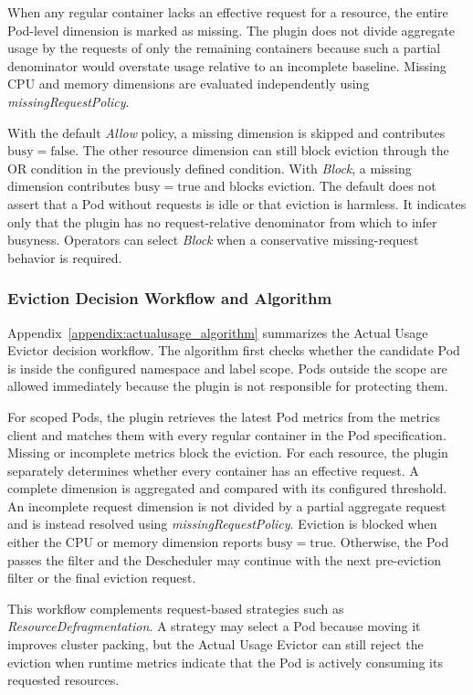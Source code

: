 When any regular container lacks an effective request for a resource, the entire Pod-level dimension is marked as missing. The plugin does not divide aggregate usage by the requests of only the remaining containers because such a partial denominator would overstate usage relative to an incomplete baseline. Missing CPU and memory dimensions are evaluated independently using \textit{missingRequestPolicy}.

With the default \textit{Allow} policy, a missing dimension is skipped and contributes \(\mathrm{busy}=\mathrm{false}\). The other resource dimension can still block eviction through the OR condition in the previously defined condition. With \textit{Block}, a missing dimension contributes \(\mathrm{busy}=\mathrm{true}\) and blocks eviction. The default does not assert that a Pod without requests is idle or that eviction is harmless. It indicates only that the plugin has no request-relative denominator from which to infer busyness. Operators can select \textit{Block} when a conservative missing-request behavior is required.

\subsubsection{Eviction Decision Workflow and Algorithm}
\label{sec:actualusage_algorithm}

Appendix~\ref{appendix:actualusage_algorithm} summarizes the Actual Usage Evictor decision workflow. The algorithm first checks whether the candidate Pod is inside the configured namespace and label scope. Pods outside the scope are allowed immediately because the plugin is not responsible for protecting them.

For scoped Pods, the plugin retrieves the latest Pod metrics from the metrics client and matches them with every regular container in the Pod specification. Missing or incomplete metrics block the eviction. For each resource, the plugin separately determines whether every container has an effective request. A complete dimension is aggregated and compared with its configured threshold. An incomplete request dimension is not divided by a partial aggregate request and is instead resolved using \textit{missingRequestPolicy}. Eviction is blocked when either the CPU or memory dimension reports \(\mathrm{busy}=\mathrm{true}\). Otherwise, the Pod passes the filter and the Descheduler may continue with the next pre-eviction filter or the final eviction request.

This workflow complements request-based strategies such as \textit{ResourceDefragmentation}. A strategy may select a Pod because moving it improves cluster packing, but the Actual Usage Evictor can still reject the eviction when runtime metrics indicate that the Pod is actively consuming its requested resources.

